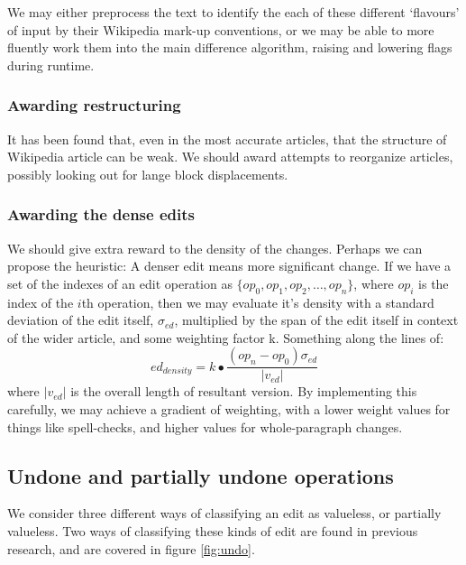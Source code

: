 \documentclass[a4paper,11pt,twoside,notitlepage]{article}
\begin{document}
        We may either preprocess the text to identify the each of
        these different `flavours' of input by their Wikipedia mark-up
        conventions, or we may be able to more fluently work them into
        the main difference algorithm, raising and lowering flags
        during runtime.

        \subsubsection*{Awarding restructuring}
        \label{restructuring}
        It has been found that, even in the most accurate articles,
        that the structure of Wikipedia article can be
        weak.\cite{Giles2005} We should award attempts to reorganize
        articles, possibly looking out for lange block displacements.
        
        \subsubsection*{Awarding the dense edits}
        We should give extra reward to the density of the
        changes. Perhaps we can propose the heuristic: A denser edit
        means more significant change. If we have a set
        of the indexes of an edit operation as
        $\{op_0,op_1,op_2,\dots, op_n\}$, where $op_i$ is the index of
        the $i$th operation, then we may evaluate it's density with a
        standard deviation of the edit itself, $\sigma_{ed}$,
        multiplied by the span of the edit itself in context of the
        wider article, and some weighting factor k. Something along
        the lines of:
        $$ed_{density} = k\bullet\frac{(op_n -
          op_0)\sigma_{ed}}{|v_{ed}|}$$ where $|v_{ed}|$ is the overall
        length of resultant version. By implementing this carefully,
        we may achieve a gradient of weighting, with a lower weight
        values for things like spell-checks, and higher values for
        whole-paragraph changes.

        \subsection*{Undone and partially undone operations}
        We consider three different ways of classifying an edit as
        valueless, or partially valueless. Two ways of classifying
        these kinds of edit are found in previous research, and are
        covered in figure \ref{fig:undo}.
\end{document}
